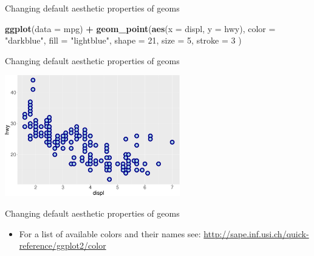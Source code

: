 \documentclass[ignorenonframetext,]{beamer}
\newenvironment{Shaded}{\begin{snugshade}}{\end{snugshade}}
\newcommand{\DataTypeTok}[1]{\textcolor[rgb]{0.13,0.29,0.53}{#1}}
\newcommand{\DecValTok}[1]{\textcolor[rgb]{0.00,0.00,0.81}{#1}}
\newcommand{\KeywordTok}[1]{\textcolor[rgb]{0.13,0.29,0.53}{\textbf{#1}}}
\newcommand{\NormalTok}[1]{#1}
\newcommand{\OperatorTok}[1]{\textcolor[rgb]{0.81,0.36,0.00}{\textbf{#1}}}
\newcommand{\StringTok}[1]{\textcolor[rgb]{0.31,0.60,0.02}{#1}}
\providecommand{\tightlist}{%
  \setlength{\itemsep}{0pt}\setlength{\parskip}{0pt}}
\begin{document}
\begin{frame}[fragile]{Changing default aesthetic properties of geoms}
\protect\hypertarget{changing-default-aesthetic-properties-of-geoms-14}{}

\begin{Shaded}
\begin{Highlighting}[]
\KeywordTok{ggplot}\NormalTok{(}\DataTypeTok{data =}\NormalTok{ mpg) }\OperatorTok{+}
\StringTok{  }\KeywordTok{geom_point}\NormalTok{(}\KeywordTok{aes}\NormalTok{(}\DataTypeTok{x =}\NormalTok{ displ, }\DataTypeTok{y =}\NormalTok{ hwy),}
    \DataTypeTok{color =} \StringTok{"darkblue"}\NormalTok{,}
    \DataTypeTok{fill =} \StringTok{"lightblue"}\NormalTok{,}
    \DataTypeTok{shape =} \DecValTok{21}\NormalTok{,}
    \DataTypeTok{size =} \DecValTok{5}\NormalTok{,}
    \DataTypeTok{stroke =} \DecValTok{3}
\NormalTok{  )}
\end{Highlighting}
\end{Shaded}

\end{frame}

\begin{frame}{Changing default aesthetic properties of geoms}
\protect\hypertarget{changing-default-aesthetic-properties-of-geoms-15}{}

\begin{center}\includegraphics[height=200px]{data-visualization_files/figure-beamer/unnamed-chunk-51-1} \end{center}

\end{frame}

\begin{frame}{Changing default aesthetic properties of geoms}
\protect\hypertarget{changing-default-aesthetic-properties-of-geoms-16}{}

\begin{itemize}
\tightlist
\item
  For a list of available colors and their names see:
  \url{http://sape.inf.usi.ch/quick-reference/ggplot2/color}
\end{itemize}

\end{frame}
\end{document}
